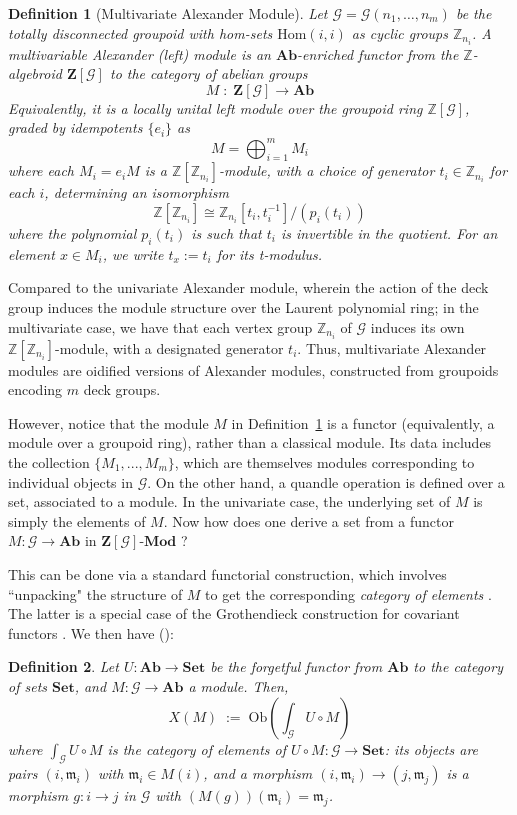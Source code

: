 \documentclass[a4paper,12pt]{article}
\newtheorem{definition}{Definition}[section]
\newcommand{\Z}{\mathbb{Z}}
\newcommand{\Zb}{\mathbf{Z}}
\newcommand{\calG}{\mathcal{G}}
\newcommand{\Ab}{\mathbf{Ab}}
\newcommand{\Ob}{\mathrm{Ob}}
\newcommand{\Hom}{\mathrm{Hom}}
\newcommand{\Set}{\mathbf{Set}}
\newcommand{\Gint}[1]{\int_{#1}}
\newcommand{\m}{\mathfrak{m}}
\begin{document}
\begin{definition}[Multivariate Alexander Module] 
\label{mamdef}
Let $\calG = \calG(n_1, \ldots, n_m)$ be the totally disconnected groupoid with  hom-sets $\Hom (i,i)$ as cyclic groups $\Z_{n_i}$.  
A \emph{multivariable Alexander (left) module} is an $\Ab$-enriched functor from the $\Z$-algebroid  $\Zb[\calG]$ to the category of abelian groups
\[
  M \;:\; \Zb[\calG] \longrightarrow \Ab
\]
Equivalently, it is a locally unital left module over the groupoid ring
$\Z[\calG]$, graded by idempotents $\{ e_i \}$  as 
\[  M = \bigoplus_{i = 1}^m  M_i   \]   
where each   $M_i = e_i M$  is a $\Z[\Z_{n_i}]$-module, with a choice of generator $t_i \in \Z_{n_i}$ for each $i$,  determining an isomorphism
\[ \Z[\Z_{n_i}] \cong \Z_{n_i}[t_i, t_i^{-1}]/( p_i (t_i) )  \] 
where the polynomial $p_i (t_i)$ is such that $t_i$ is invertible in the quotient.  
For an element $x \in M_i$, we write $t_x := t_i$ for its \emph{t-modulus}.
\end{definition}

Compared to the univariate Alexander module, wherein  the action of the deck group induces the module structure over the Laurent polynomial ring; in the multivariate case, we have that each vertex group $\Z_{n_i}$ of $\calG$ induces its own $\Z[\Z_{n_i}]$-module, with a designated generator $t_i$.  Thus, multivariate Alexander modules are oidified versions of Alexander modules, constructed from groupoids encoding $m$ deck groups.  

However, notice that the module $M$ in Definition~\ref{mamdef} is a functor (equivalently, a module over a groupoid ring), rather than a classical module. Its data includes the collection $\{ M_1, ... , M_m \}$, which are themselves  modules corresponding to individual objects in $\calG$. On the other hand, a quandle operation is defined over a set, associated to a module.  
In the univariate case, the underlying set of $M$ is simply the elements of $M$. Now how does one derive a set from a functor $M \colon \calG \to \Ab$ in $\Zb[\calG]\textbf{-Mod}$ $\!$?  

This can be done via a standard functorial construction, which involves ``unpacking" the structure of  $M$ to get the corresponding  \emph{category of elements}   \cite{grothendieck71, riehl2016category, nlab:category_of_elements}. The latter is a special case of the Grothendieck construction for covariant functors  \cite{grothendieck71}.  We then have (\cite{riehl2016category, nlab:category_of_elements}):    
\begin{definition}  
\label{defele}
Let $U \colon \Ab \to \Set$ be the forgetful functor from $\Ab$ to the category of sets $\Set$,  and
$M \colon \calG \to \Ab$ a module. Then,  
\[
  X(M) \;:=\; \Ob\!\left(\Gint{\calG} U \circ M\right)  
\]
where $\Gint{\calG}{U \circ M}$ is the \emph{category of elements} of
$U \circ M \colon \calG \to \Set$: its objects are pairs $(i, \m_i)$
with $\m_i \in M(i)$, and a morphism $(i, \m_i) \to (j, \m_j)$ is a morphism
$g \colon i \to j$ in $\calG$ with $(M(g))(\m_i) = \m_j$.  
\end{definition}
\end{document}

